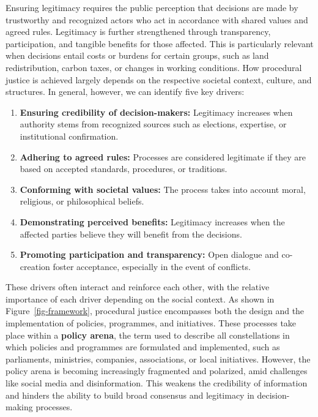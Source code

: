 \documentclass[
  a4paper,
  DIV=11,
  numbers=noendperiod,
  oneside,
  openany]{scrreprt}
\begin{document}
Ensuring legitimacy requires the public perception that decisions are
made by trustworthy and recognized actors who act in accordance with
shared values and agreed rules. Legitimacy is further strengthened
through transparency, participation, and tangible benefits for those
affected. This is particularly relevant when decisions entail costs or
burdens for certain groups, such as land redistribution, carbon taxes,
or changes in working conditions. How procedural justice is achieved
largely depends on the respective societal context, culture, and
structures. In general, however, we can identify five key drivers:

\begin{enumerate}
\def\labelenumi{\arabic{enumi}.}
\item
  \textbf{Ensuring credibility of decision-makers:} Legitimacy increases
  when authority stems from recognized sources such as elections,
  expertise, or institutional confirmation.
\item
  \textbf{Adhering to agreed rules:} Processes are considered legitimate
  if they are based on accepted standards, procedures, or traditions.
\item
  \textbf{Conforming with societal values:} The process takes into
  account moral, religious, or philosophical beliefs.
\item
  \textbf{Demonstrating perceived benefits:} Legitimacy increases when
  the affected parties believe they will benefit from the decisions.
\item
  \textbf{Promoting participation and transparency:} Open dialogue and
  co-creation foster acceptance, especially in the event of conflicts.
\end{enumerate}

These drivers often interact and reinforce each other, with the relative
importance of each driver depending on the social context. As shown in
Figure~\ref{fig-framework}, procedural justice encompasses both the
design and the implementation of policies, programmes, and initiatives.
These processes take place within a \textbf{policy arena}, the term used
to describe all constellations in which policies and programmes are
formulated and implemented, such as parliaments, ministries, companies,
associations, or local initiatives. However, the policy arena is
becoming increasingly fragmented and polarized, amid challenges like
social media and disinformation. This weakens the credibility of
information and hinders the ability to build broad consensus and
legitimacy in decision-making processes.
\end{document}
